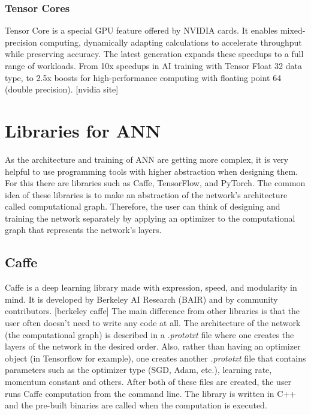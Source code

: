 \subsubsection{Tensor Cores}

Tensor Core is a special GPU feature offered by NVIDIA cards. It enables mixed-precision computing, dynamically adapting calculations to accelerate throughput while preserving accuracy. The latest generation expands these speedups to a full range of workloads. From 10x speedups in AI training with Tensor Float 32 data type, to 2.5x boosts for high-performance computing with floating point 64 (double precision). [nvidia site]

\section{Libraries for ANN}

As the architecture and training of ANN are getting more complex, it is very helpful to use programming tools with higher abstraction when designing them. For this there are libraries such as Caffe, TensorFlow, and PyTorch. The common idea of these libraries is to make an abstraction of the network's architecture called computational graph. Therefore, the user can think of designing and training the network separately by applying an optimizer to the computational graph that represents the network's layers. 

\subsection{Caffe}

Caffe is a deep learning library made with expression, speed, and modularity in mind. It is developed by Berkeley AI Research (BAIR) and by community contributors. [berkeley caffe] The main difference from other libraries is that the user often doesn't need to write any code at all. The architecture of the network (the computational graph) is described in a \textit{.prototxt} file where one creates the layers of the network in the desired order. Also, rather than having an optimizer object (in Tensorflow for example), one creates another \textit{.prototxt} file that contains parameters such as the optimizer type (SGD, Adam, etc.), learning rate, momentum constant and others. After both of these files are created, the user runs Caffe computation from the command line. The library is written in C++ and the pre-built binaries are called when the computation is executed.

